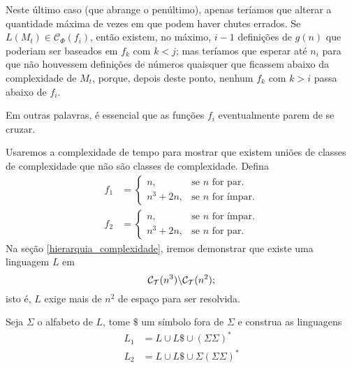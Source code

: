 Neste último caso
(que abrange o penúltimo),
apenas teríamos que alterar a quantidade máxima de vezes
em que podem haver chutes errados.
Se $L(M_t) \in \mathcal C_\Phi(f_i)$,
então existem, no máximo,
$i - 1$ definições de $g(n)$
que poderiam ser baseados em $f_k$
com $k < j$;
mas teríamos que esperar até $n_i$
para que não houvessem definições
de números quaisquer que ficassem abaixo da complexidade de $M_t$,
porque, depois deste ponto,
nenhum $f_k$ com $k > i$
passa abaixo de $f_i$.

Em outras palavras,
é essencial que as funções $f_i$
eventualmente parem de se cruzar.

\begin{counterexample}
    Usaremos a complexidade de tempo para mostrar que
    existem uniões de classes de complexidade
    que não são classes de complexidade.
    Defina
    \begin{align*}
        f_1 & = \begin{cases}
                    n, & \text{se $n$ for par.} \\
                    n^3 + 2n, & \text{se $n$ for ímpar.}
                \end{cases} \\
        f_2 & = \begin{cases}
                    n, & \text{se $n$ for ímpar.} \\
                    n^3 + 2n, & \text{se $n$ for par.}
                \end{cases}
    \end{align*}
    Na seção \ref{hierarquia_complexidade},
    iremos demonstrar que existe uma linguagem $L$ em
    \begin{equation*}
        \mathcal C_{\mathcal{T}}(n^3) \backslash \mathcal C_{\mathcal{T}}(n^2);
    \end{equation*}
    isto é, $L$ exige mais de $n^2$ de espaço para ser resolvida.

    Seja $\Sigma$ o alfabeto de $L$,
    tome $\$$ um símbolo fora de $\Sigma$
    e construa as linguagens
    \begin{align*}
        L_1 &= L \cup L\$ \cup ( \Sigma \Sigma )^* \\
        L_2 &= L \cup L\$ \cup \Sigma ( \Sigma \Sigma )^*
    \end{align*}


\end{counterexample}
